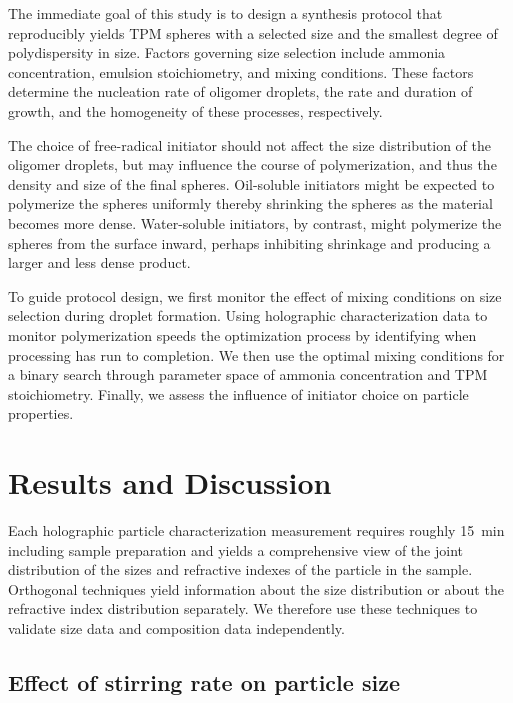 \documentclass[journal=langd5,manuscript=article]{achemso}
\begin{document}
The immediate goal of this study is to design
a synthesis protocol that reproducibly 
yields TPM spheres with a selected size and
the smallest degree of polydispersity in size.
Factors governing size selection include
ammonia concentration, emulsion stoichiometry,
and mixing conditions.
These factors determine the nucleation rate of oligomer
droplets, the rate and duration of growth, 
and the homogeneity of these processes, respectively.

The choice of free-radical initiator should not affect
the size distribution of the oligomer droplets, but
may influence the course of polymerization, and thus
the density and size of the final spheres.
Oil-soluble initiators might be expected to
polymerize the spheres uniformly thereby
shrinking the spheres as the material becomes more
dense.
Water-soluble initiators, by contrast, might
polymerize the spheres from the surface inward,
perhaps inhibiting shrinkage and producing a 
larger and less dense product.

To guide protocol design, we first monitor
the effect of mixing conditions on size selection
during droplet formation.
Using holographic characterization data to 
monitor polymerization speeds the optimization process
by identifying when processing has run to completion.
We then use the optimal mixing conditions for
a binary search through parameter space of
ammonia concentration and TPM stoichiometry.
Finally, we assess the influence of initiator
choice on particle properties.

\section{Results and Discussion}
\label{sec:results}

Each holographic particle characterization
measurement
requires roughly \SI{15}{\minute} including
sample preparation and yields 
a comprehensive view of the joint
distribution of the sizes and refractive
indexes of the particle in the sample.
Orthogonal techniques yield information
about the size distribution or about
the refractive index distribution separately.
We therefore use these techniques to validate
size data and composition data independently.

\subsection{Effect of stirring rate on particle size}
\label{sec:stir}
\end{document}
